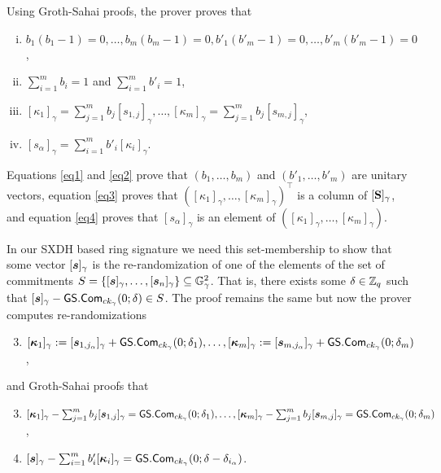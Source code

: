Using Groth-Sahai proofs, the prover proves that
\begin{enumerate}[i.]
\item $b_1(b_1-1)=0,\ldots,b_m(b_m-1)=0,b'_1(b'_m-1)=0,\ldots,b'_m(b'_m-1)=0$,\label{eq1}
\item $\sum_{i=1}^m b_i =1$ and $\sum_{i=1}^m b'_i=1$,\label{eq2}
\item $[\kappa_1]_\gamma=\sum_{j=1}^m b_j [s_{1,j}]_\gamma,\ldots,[\kappa_m]_\gamma=\sum_{j=1}^m b_j[s_{m,j}]_\gamma$,\label{eq3}
\item $[s_\alpha]_\gamma=\sum_{i=1}^m b'_i[\kappa_i]_\gamma$.\label{eq4}
\end{enumerate}
Equations \ref{eq1} and \ref{eq2} prove that $(b_1,\ldots,b_m)$ and $(b'_1,\ldots,b'_m)$ are unitary vectors, equation \ref{eq3} proves that $([\kappa_1]_\gamma,\ldots,[\kappa_m]_\gamma)^\top$ is a column of $[\mathbf{{S}}]_\gamma$, and equation \ref{eq4} proves that $[s_\alpha]_\gamma$ is an element of $([\kappa_1]_\gamma,\ldots,[\kappa_m]_\gamma)$.

In our SXDH based ring signature we need this set-membership to show that some vector $[{\boldsymbol{s}}]_\gamma$ is the re-randomization of one of the elements of the set of commitments $S = \{[{\boldsymbol{s}}]_\gamma,\ldots,[{\boldsymbol{s}}_n]_\gamma\}\subseteq\mathbb{G}_\gamma^2$. That is, there exists some $\delta\in\mathbb{Z}_q$ such that $[{\boldsymbol{s}}]_\gamma-{\mathsf{GS}}.\mathsf{Com}_{ck_\gamma}(0;\delta)\in S$. The proof remains the same but now
the prover computes re-randomizations
\begin{enumerate}[1'.]
\setcounter{enumi}{2}
\item $[{\boldsymbol{\kappa}}_1]_\gamma:=[{\boldsymbol{s}}_{1,j_\alpha}]_\gamma+{\mathsf{GS}}.\mathsf{Com}_{ck_\gamma}(0;\delta_1),\ldots,[{\boldsymbol{\kappa}}_m]_\gamma:=[{\boldsymbol{s}}_{m,j_\alpha}]_\gamma+{\mathsf{GS}}.\mathsf{Com}_{ck_\gamma}(0;\delta_m)$,
\end{enumerate}
and Groth-Sahai proofs that
\begin{enumerate}[i'.]
\setcounter{enumi}{2}
\item $[{\boldsymbol{\kappa}}_1]_\gamma - \sum_{j=1}^m b_j [{\boldsymbol{s}}_{1,j}]_\gamma = {\mathsf{GS}}.\mathsf{Com}_{ck_\gamma}(0;\delta_1),\ldots,[{\boldsymbol{\kappa}}_m]_\gamma-\sum_{j=1}^m b_j[{\boldsymbol{s}}_{m,j}]_\gamma = {\mathsf{GS}}.\mathsf{Com}_{ck_\gamma}(0;\delta_m)$,\label{eq3p}
\item $[{\boldsymbol{s}}]_\gamma - \sum_{i=1}^m b'_i[{\boldsymbol{\kappa}}_i]_\gamma  = {\mathsf{GS}}.\mathsf{Com}_{ck_\gamma}(0;\delta-\delta_{i_\alpha})$.\label{eq4p}
\end{enumerate}
